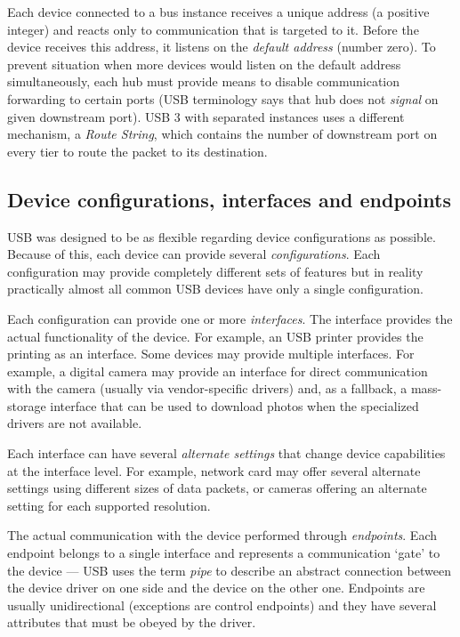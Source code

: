 Each device connected to a bus instance receives a unique address (a
positive integer) and reacts only to communication that is targeted to it.
Before the device receives this address, it listens on the \textit{default
address} (number zero). To prevent situation when more devices would listen on
the default address simultaneously, each hub must provide means to disable
communication forwarding to certain ports (USB terminology says that hub does
not \textit{signal} on given downstream port). USB 3 with separated instances
uses a different mechanism, a \emph{Route String}, which contains the number of
downstream port on every tier to route the packet to its destination.

\subsection{Device configurations, interfaces and endpoints}

USB was designed to be as flexible regarding device configurations as possible.
Because of this, each device can provide several \textit{configurations}. Each
configuration may provide completely different sets of features but in reality
practically almost all common USB devices have only a single configuration.

Each configuration can provide one or more \textit{interfaces}. The interface
provides the actual functionality of the device. For example, an USB printer
provides the printing as an interface. Some devices may provide multiple
interfaces. For example, a digital camera may provide an interface for direct
communication with the camera (usually via vendor-specific drivers) and, as a
fallback, a mass-storage interface that can be used to download photos when the
specialized drivers are not available.

Each interface can have several \textit{alternate settings} that change device
capabilities at the interface level. For example, network card may offer
several alternate settings using different sizes of data packets, or cameras
offering an alternate setting for each supported resolution.

The actual communication with the device performed through \textit{endpoints}.
Each endpoint belongs to a single interface and represents a communication
‘gate’ to the device — USB uses the term \textit{pipe} to describe an abstract
connection between the device driver on one side and the device on the other
one. Endpoints are usually unidirectional (exceptions are control endpoints)
and they have several attributes that must be obeyed by the driver.

